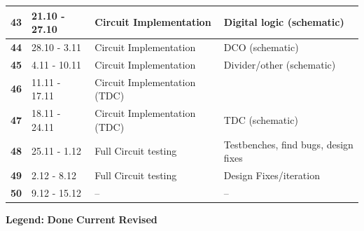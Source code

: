 \documentclass[t, screen, aspectratio=43]{beamer}
\begin{document}
\begin{frame}
\begin{table}[htb!]
\begin{tabular}{|l|l|l|l|}
			\hline 
			\rule[-1ex]{0pt}{2.5ex} \color{red}\cellcolor{green!20}\textbf{43}&\color{red}\cellcolor{green!20}21.10 - 27.10&\color{red}\cellcolor{green!20}Circuit Implementation&\color{red}\cellcolor{green!20}Digital logic (schematic)\\ 
			\hline 
			\rule[-1ex]{0pt}{2.5ex} \color{red}\textbf{44}& \color{red}28.10 - 3.11& \color{red}Circuit Implementation& \color{red}DCO (schematic)\\ 
			\hline 
			\rule[-1ex]{0pt}{2.5ex} \color{red}\textbf{45}& \color{red}4.11 - 10.11& \color{red}Circuit Implementation& \color{red}Divider/other (schematic)\\ 
			\hline 
			\rule[-1ex]{0pt}{2.5ex} \color{red}\textbf{46}& \color{red}11.11 - 17.11& \color{red}Circuit Implementation (TDC)& \\ 
			\hline 
			\rule[-1ex]{0pt}{2.5ex} \color{red}\textbf{47}& \color{red}18.11 - 24.11& \color{red}Circuit Implementation (TDC)& \color{red}TDC (schematic)\\ 
			\hline 
			\rule[-1ex]{0pt}{2.5ex} \color{red}\textbf{48}& \color{red}25.11 - 1.12& \color{red}Full Circuit testing & \color{red}Testbenches, find bugs, design fixes\\ 
			\hline 
			\rule[-1ex]{0pt}{2.5ex} \color{red}\textbf{49}& \color{red}2.12 - 8.12& \color{red}Full Circuit testing& \color{red}Design Fixes/iteration\\ 
			\hline 
			\rule[-1ex]{0pt}{2.5ex} \color{red}\textbf{50}& \color{red}9.12 - 15.12& \color{red}--& \color{red}--\\ 
			\hline 
		\end{tabular}
		\begin{flushleft}\textbf{Legend:} \colorbox{red!20}{\textbf{Done}} \colorbox{green!20}{\textbf{Current}}  \colorbox{blue!20}{\textbf{Revised}}
		\end{flushleft}
	\end{table}   
\end{frame}
\end{document}
